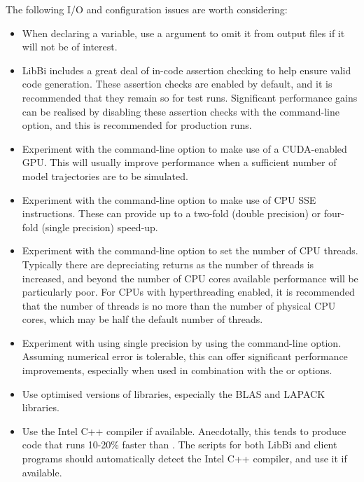 The following I/O and configuration issues are worth considering:
\begin{itemize}
\item When declaring a variable, use a  argument to omit
  it from output files if it will not be of interest.

\item LibBi includes a great deal of in-code assertion
  checking to help ensure valid code
  generation. These assertion checks are enabled by default, and it is
  recommended that they remain so for test runs. Significant performance gains
  can be realised by disabling these assertion checks with the
   command-line option, and this is recommended for
  production runs.

\item {} Experiment with the  command-line
  option to make use of a CUDA-enabled GPU. This will usually
  improve performance when a sufficient number of model trajectories are to be
  simulated.

\item {} Experiment with the  command-line
  option to make use of CPU SSE instructions. These can
  provide up to a two-fold (double precision) or four-fold (single precision)
  speed-up.

\item {} Experiment
  with the  command-line option to set the number of CPU
  threads. Typically there are depreciating returns as the number of threads
  is increased, and beyond the number of CPU cores available performance will
  be particularly poor. For CPUs with hyperthreading enabled, it is
  recommended that the number of threads is no more than the number of
  physical CPU cores, which may be half the default number of threads.

\item {} Experiment with using
  single precision by using the 
  command-line option. Assuming numerical error is tolerable, this can offer
  significant performance improvements, especially when used in combination
  with the  or  options.

\item Use optimised versions of libraries, especially the BLAS and
  LAPACK libraries.

\item Use the Intel C++ compiler if
  available. Anecdotally, this tends to produce code that runs 10-20\% faster
  than . The  scripts for both LibBi and
  client programs should automatically detect the Intel C++
  compiler, and use it if available.

\end{itemize}

